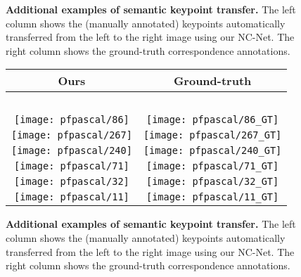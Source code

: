 \documentclass{article}
\begin{document}
\begin{figure}[tbp]
\begin{tabular}{@{\hskip 1pt}c@{\hskip 6pt}|@{\hskip 6pt}c@{\hskip 1pt}}
  \end{tabular}
  \endgroup
  \vspace{2pt}
  \caption{{\bf Additional examples of semantic  keypoint  transfer.} The left column shows the (manually annotated) keypoints automatically transferred from the left to the right image using our NC-Net. The right column shows the ground-truth correspondence annotations.}
  \label{fig:qualPascal}
\end{figure}\begin{figure}[tbp]
  \centering
  \begingroup
  \renewcommand{\arraystretch}{0.5}
  \begin{tabular}{@{\hskip 1pt}c@{\hskip 6pt}|@{\hskip 6pt}c@{\hskip 1pt}}
    Ours & Ground-truth \\ \hline
    ~ & ~ \\
\texttt{[image: pfpascal/86]}  &
\texttt{[image: pfpascal/86\_GT]} \\
\texttt{[image: pfpascal/267]}  &
\texttt{[image: pfpascal/267\_GT]} \\
\texttt{[image: pfpascal/240]}  &
\texttt{[image: pfpascal/240\_GT]} \\
\texttt{[image: pfpascal/71]}  &
\texttt{[image: pfpascal/71\_GT]} \\
\texttt{[image: pfpascal/32]}  &
\texttt{[image: pfpascal/32\_GT]} \\
\texttt{[image: pfpascal/11]}  &
\texttt{[image: pfpascal/11\_GT]} \\
  \end{tabular}
  \endgroup
  \vspace{2pt}
  \caption{{\bf Additional examples of semantic  keypoint  transfer.} The left column shows the (manually annotated) keypoints automatically transferred from the left to the right image using our NC-Net. The right column shows the ground-truth correspondence annotations.}
  \label{fig:qualPascal2}
\end{figure}%
\end{document}
